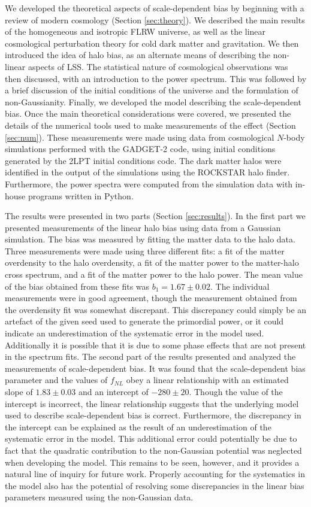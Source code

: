 \documentclass[10pt,letterpaper,final]{iopart}
\numberwithin{equation}{subsection}
\begin{document}
We developed the theoretical aspects of scale-dependent bias by beginning with a review of modern cosmology (Section \ref{sec:theory}). We described the main results of the homogeneous and isotropic FLRW universe, as well as the linear cosmological perturbation theory for cold dark matter and gravitation. We then introduced the idea of halo bias, as an alternate means of describing the non-linear aspects of LSS. The statistical nature of cosmological observations was then discussed, with an introduction to the power spectrum. This was followed by a brief discussion of the initial conditions of the universe and the formulation of non-Gaussianity. Finally, we developed the model describing the scale-dependent bias. Once the main theoretical considerations were covered, we presented the details of the numerical tools used to make measurements of the effect (Section \ref{sec:num}). These measurements were made using data from cosmological $N$-body simulations performed with the GADGET-2 code, using initial conditions generated by the 2LPT initial conditions code. The dark matter halos were identified in the output of the simulations using the ROCKSTAR halo finder. Furthermore, the power spectra were computed from the simulation data with in-house programs written in Python. 

The results were presented in two parts (Section \ref{sec:results}). In the first part we presented measurements of the linear halo bias using data from a Gaussian simulation. The bias was measured by fitting the matter data to the halo data. Three measurements were made using three different fits: a fit of the matter overdensity to the halo overdensity, a fit of the matter power to the matter-halo cross spectrum, and a fit of the matter power to the halo power. The mean value of the bias obtained from these fits was $b_1 = 1.67 \pm 0.02$. The individual measurements were in good agreement, though the measurement obtained from the overdensity fit was somewhat discrepant. This discrepancy could simply be an artefact of the given seed used to generate the primordial power, or it could indicate an underestimation of the systematic error in the model used. Additionally it is possible that it is due to some phase effects that are not present in the spectrum fits. The second part of the results presented and analyzed the measurements of scale-dependent bias. It was found that the scale-dependent bias parameter and the values of $f_{NL}$ obey a linear relationship with an estimated slope of $1.83 \pm 0.03$ and an intercept of $-280 \pm 20$. Though the value of the intercept is incorrect, the linear relationship suggests that the underlying model used to describe scale-dependent bias is correct. Furthermore, the discrepancy in the intercept can be explained as the result of an underestimation of the systematic error in the model. This additional error could potentially be due to fact that the quadratic contribution to the non-Gaussian potential was neglected when developing the model. This remains to be seen, however, and it provides a natural line of inquiry for future work. Properly accounting for the systematics in the model also has the potential of resolving some discrepancies in the linear bias parameters measured using the non-Gaussian data. 
\end{document}
